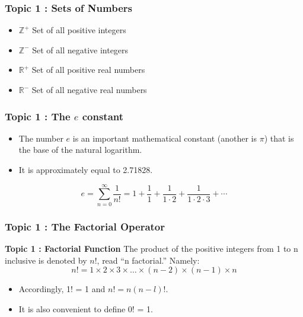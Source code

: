 \documentclass{beamer}
\begin{document}
\begin{frame}
	\frametitle{Topic 1 : Sets of Numbers}
	\begin{itemize}
		\item $\mathbb{Z}^{+}$ Set of all positive integers
		\item $\mathbb{Z}^{-}$ Set of all negative integers
		\item $\mathbb{R}^{+}$ Set of all positive real numbers
		\item $\mathbb{R}^{-}$ Set of all negative real numbers
	\end{itemize}
\end{frame}


\begin{frame}
\frametitle{Topic 1 : The $e$ constant}
\begin{itemize}
\item The number $e$ is an important mathematical constant (another is $\pi$) that is the base of the natural logarithm. 
\item It is approximately equal to 2.71828.
\end{itemize}
\[e =  \displaystyle\sum\limits_{n = 0}^{ \infty} \dfrac{1}{n!} = 1 + \frac{1}{1} + \frac{1}{1\cdot 2} + \frac{1}{1\cdot 2\cdot 3} + \cdots  \]
\end{frame}

\begin{frame}
	\frametitle{Topic 1 : The Factorial Operator}
	\textbf{Topic 1 : Factorial Function}
	The product of the positive integers from 1 to n inclusive is denoted by $n!$, read “n factorial.” Namely:
	\[n! = 1 \times 2 \times 3 \times \ldots \times (n−2) \times(n−1)\times n\] 
	\begin{itemize}
		\item Accordingly, 1! = 1 and $n! = n(n − l)!$. 
		
		\item It is also convenient to define 0! = 1.
	\end{itemize}	
\end{frame}
\end{document}
